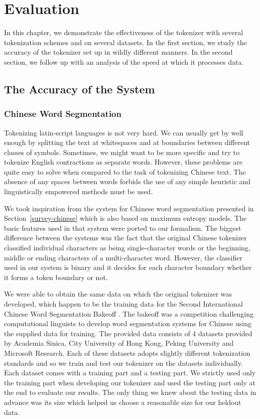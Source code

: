 \chapter{Evaluation}
\label{chap:eval}

In this chapter, we demonstrate the effectiveness of the tokenizer with several
tokenization schemes and on several datasets. In the first section, we study
the accuracy of the tokenizer set up in wildly different manners. In the
second section, we follow up with an analysis of the speed at which it
processes data.

\section{The Accuracy of the System}
\label{sec:eval-acc}

\subsection{Chinese Word Segmentation}
\label{ssec:eval-acc-chinese}

Tokenizing latin-script languages is not very hard. We can usually get by well
enough by splitting the text at whitespaces and at boundaries between different
classes of symbols. Sometimes, we might want to be more specific and try to
tokenize English contractions as separate words. However, these problems are
quite easy to solve when compared to the task of tokenizing Chinese text. The
absence of any spaces between words forbids the use of any simple heuristic and
linguistically empowered methods must be used.

We took inspiration from the system for Chinese word segmentation presented in
Section~\ref{survey-chinese} \cite{seg-chinese-maxent} which is also based on
maximum entropy models. The basic features used in that system were ported to
our formalism. The biggest difference between the systems was the fact that the
original Chinese tokenizer classified individual characters as being
single-character words or the beginning, middle or ending characters of a
multi-character word. However, the classifier used in our system is binary and
it decides for each character boundary whether it forms a token boundary or
not.

We were able to obtain the same data on which the original tokenizer was
developed, which happen to be the training data for the Second International
Chinese Word Segmentation Bakeoff \cite{web-bakeoff}. The bakeoff was a
competition challenging computational linguists to develop word segmentation
systems for Chinese using the supplied data for training. The provided data
consists of 4 datasets provided by Academia Sinica, City University of Hong
Kong, Peking University and Microsoft Research. Each of these datasets adopts
slightly different tokenization standards and so we train and test our
tokenizer on the datasets individually. Each dataset comes with a training part
and a testing part. We strictly used only the training part when developing our
tokenizer and used the testing part only at the end to evaluate our results.
The only thing we knew about the testing data in advance was its size which
helped us choose a reasonable size for our heldout data.

